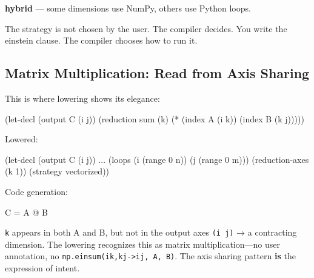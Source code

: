 \documentclass[11pt,titlepage]{article}
\newenvironment{Shaded}{}{}
\newcommand{\DecValTok}[1]{\textcolor[rgb]{0.25,0.63,0.44}{#1}}
\newcommand{\NormalTok}[1]{#1}
\newcommand{\OperatorTok}[1]{\textcolor[rgb]{0.40,0.40,0.40}{#1}}
\begin{document}
\textbf{hybrid} --- some dimensions use NumPy, others use Python loops.

The strategy is not chosen by the user. The compiler decides. You write
the einstein clause. The compiler chooses how to run it.

\vspace{2em}

\hypertarget{matrix-multiplication-read-from-axis-sharing}{%
\subsection{Matrix Multiplication: Read from Axis
Sharing}\label{matrix-multiplication-read-from-axis-sharing}}

This is where lowering shows its elegance:

\begin{Shaded}
\begin{Highlighting}[]
\NormalTok{(let-decl (output C (i j))}
\NormalTok{  (reduction sum (k)}
\NormalTok{    (}\OperatorTok{*}\NormalTok{ (index A (i k)) (index B (k j)))))}
\end{Highlighting}
\end{Shaded}

Lowered:

\begin{Shaded}
\begin{Highlighting}[]
\NormalTok{(let-decl (output C (i j)) ...}
\NormalTok{  (loops (i (range }\DecValTok{0}\NormalTok{ n)) (j (range }\DecValTok{0}\NormalTok{ m)))}
\NormalTok{  (reduction-axes (k }\DecValTok{1}\NormalTok{))}
\NormalTok{  (strategy vectorized))}
\end{Highlighting}
\end{Shaded}

Code generation:

\begin{Shaded}
\begin{Highlighting}[]
\NormalTok{C }\OperatorTok{=}\NormalTok{ A }\OperatorTok{@}\NormalTok{ B}
\end{Highlighting}
\end{Shaded}

\texttt{k} appears in both A and B, but not in the output axes
\texttt{(i\ j)} → a contracting dimension. The lowering recognizes this
as matrix multiplication---no user annotation, no
\texttt{np.einsum(\textquotesingle{}ik,kj-\textgreater{}ij\textquotesingle{},\ A,\ B)}.
The axis sharing pattern \textbf{is} the expression of intent.
\end{document}
